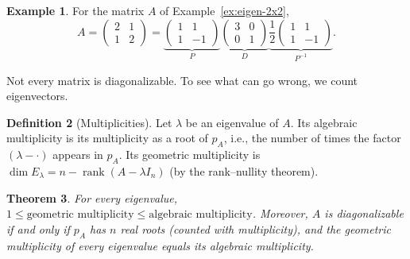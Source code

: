 \documentclass[11pt]{article}
\theoremstyle{definition}
\newtheorem{definition}{Definition}[section]
\newtheorem{example}[definition]{Example}
\theoremstyle{plain}
\newtheorem{theorem}[definition]{Theorem}
\theoremstyle{remark}
\DeclareMathOperator{\rank}{rank}
\begin{document}
\begin{example}
    For the matrix $A$ of Example~\ref{ex:eigen-2x2},
    \[A = \begin{pmatrix} 2 & 1 \\ 1 & 2 \end{pmatrix} = \underbrace{\begin{pmatrix} 1 & 1 \\ 1 & -1 \end{pmatrix}}_{P} \underbrace{\begin{pmatrix} 3 & 0 \\ 0 & 1 \end{pmatrix}}_{D} \underbrace{\frac{1}{2}\begin{pmatrix} 1 & 1 \\ 1 & -1 \end{pmatrix}}_{P^{-1}}.\]
\end{example}

Not every matrix is diagonalizable. To see what can go wrong, we count eigenvectors.

\begin{definition}[Multiplicities]
    Let $\lambda$ be an eigenvalue of $A$. Its algebraic multiplicity is its multiplicity as a root of $p_A$, i.e., the number of times the factor $(\lambda - \cdot)$ appears in $p_A$. Its geometric multiplicity is $\dim E_\lambda = n - \rank(A - \lambda I_n)$ (by the rank--nullity theorem).
\end{definition}

\begin{theorem}\label{thm:multiplicities}
    For every eigenvalue, $1 \leq \text{geometric multiplicity} \leq \text{algebraic multiplicity}$. Moreover, $A$ is diagonalizable if and only if $p_A$ has $n$ real roots (counted with multiplicity), and the geometric multiplicity of every eigenvalue equals its algebraic multiplicity.
\end{theorem}
\end{document}
